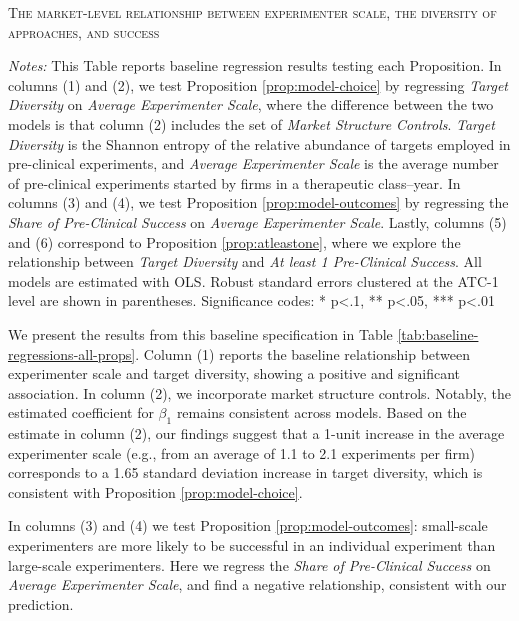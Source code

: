 \begin{table}[h!]
    \centering
    \scriptsize
    \caption{\textsc{The market-level relationship between experimenter scale, the diversity of approaches, and success}}
    \vspace{1em}
        

    \label{tab:baseline-regressions-all-props}
    \vspace{1em}
    \caption*{\scriptsize\emph{Notes:} This Table reports baseline regression results testing each Proposition. In columns (1) and (2), we test Proposition \ref{prop:model-choice} by regressing \emph{Target Diversity} on \emph{Average Experimenter Scale}, where the difference between the two models is that column (2) includes the set of \emph{Market Structure Controls}. \emph{Target Diversity} is the Shannon entropy of the relative abundance of targets employed in pre-clinical experiments, and \emph{Average Experimenter Scale} is the average number of pre-clinical experiments started by firms in a therapeutic class--year. In columns (3) and (4), we test Proposition \ref{prop:model-outcomes} by regressing the \emph{Share of Pre-Clinical Success} on \emph{Average Experimenter Scale}. Lastly, columns (5) and (6) correspond to Proposition \ref{prop:atleastone}, where we explore the relationship between \emph{Target Diversity} and \emph{At least 1 Pre-Clinical Success}. All models are estimated with OLS. Robust standard errors clustered at the ATC-1 level are shown in parentheses. Significance codes: * p<.1, ** p<.05, *** p<.01 }
\end{table}

We present the results from this baseline specification in Table \ref{tab:baseline-regressions-all-props}. Column (1) reports the baseline relationship between experimenter scale and target diversity, showing a positive and significant association. In column (2), we incorporate market structure controls. Notably, the estimated coefficient for $\beta_1$ remains consistent across models. Based on the estimate in column (2), our findings suggest that a 1-unit increase in the average experimenter scale (e.g., from an average of 1.1 to 2.1 experiments per firm) corresponds to a 1.65 standard deviation increase in target diversity, which is consistent with Proposition \ref{prop:model-choice}.

In columns (3) and (4) we test Proposition \ref{prop:model-outcomes}: small-scale experimenters are more likely to be successful in an individual experiment than large-scale experimenters. Here we regress the \emph{Share of Pre-Clinical Success} on \emph{Average Experimenter Scale}, and find a negative relationship, consistent with our prediction. 

